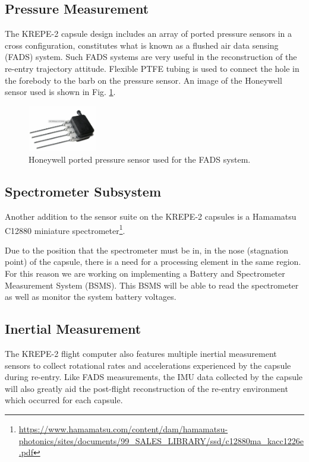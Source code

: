 \documentclass{article}
\begin{document}
\subsection{Pressure Measurement}
The KREPE-2 capsule design includes an array of ported pressure sensors in a cross configuration, constitutes what is known as a flushed air data sensing (FADS) system. Such FADS systems are very useful in the reconstruction of the re-entry trajectory attitude\cite{TODO}. Flexible PTFE tubing is used  to connect the hole in the forebody to the barb on the pressure sensor. An image of the Honeywell sensor used is shown in Fig. \ref{fig:pressure-sensor}.

\begin{figure}[H]
\centering
\includegraphics[width=3cm]{images/honeywell-sensor}
\caption{Honeywell ported pressure sensor used for the FADS system. }
\label{fig:pressure-sensor}
\end{figure}

\subsection{Spectrometer Subsystem}
Another addition to the sensor suite on the KREPE-2 capsules is a Hamamatsu C12880 miniature spectrometer\footnote{\url{https://www.hamamatsu.com/content/dam/hamamatsu-photonics/sites/documents/99_SALES_LIBRARY/ssd/c12880ma_kacc1226e.pdf}}.

Due to the position that the spectrometer must be in, in the nose (stagnation point) of the capsule, there is a need for a processing element in the same region. For this reason we are working on implementing a Battery and Spectrometer Measurement System (BSMS). This BSMS will be able to read the spectrometer as well as monitor the system battery voltages. 

\subsection{Inertial Measurement}
The KREPE-2 flight computer also features multiple inertial measurement sensors to collect rotational rates and accelerations experienced by the capsule during re-entry. Like FADS measurements, the IMU data collected by the capsule will also greatly aid the post-flight reconstruction of the re-entry environment which occurred for each capsule.
\end{document}
